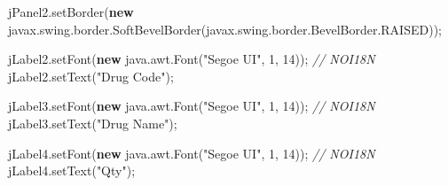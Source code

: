 \documentclass[
  10pt,
]{article}
\newenvironment{Shaded}{}{}
\newcommand{\CommentTok}[1]{\textcolor[rgb]{0.38,0.63,0.69}{\textit{#1}}}
\newcommand{\DecValTok}[1]{\textcolor[rgb]{0.25,0.63,0.44}{#1}}
\newcommand{\FunctionTok}[1]{\textcolor[rgb]{0.02,0.16,0.49}{#1}}
\newcommand{\KeywordTok}[1]{\textcolor[rgb]{0.00,0.44,0.13}{\textbf{#1}}}
\newcommand{\NormalTok}[1]{#1}
\newcommand{\OperatorTok}[1]{\textcolor[rgb]{0.40,0.40,0.40}{#1}}
\newcommand{\StringTok}[1]{\textcolor[rgb]{0.25,0.44,0.63}{#1}}
\begin{document}
\begin{Shaded}
\begin{Highlighting}[numbers=left,,]
\NormalTok{        jPanel2}\OperatorTok{.}\FunctionTok{setBorder}\OperatorTok{(}\KeywordTok{new}\NormalTok{ javax}\OperatorTok{.}\FunctionTok{swing}\OperatorTok{.}\FunctionTok{border}\OperatorTok{.}\FunctionTok{SoftBevelBorder}\OperatorTok{(}\NormalTok{javax}\OperatorTok{.}\FunctionTok{swing}\OperatorTok{.}\FunctionTok{border}\OperatorTok{.}\FunctionTok{BevelBorder}\OperatorTok{.}\FunctionTok{RAISED}\OperatorTok{));}

\NormalTok{        jLabel2}\OperatorTok{.}\FunctionTok{setFont}\OperatorTok{(}\KeywordTok{new}\NormalTok{ java}\OperatorTok{.}\FunctionTok{awt}\OperatorTok{.}\FunctionTok{Font}\OperatorTok{(}\StringTok{"Segoe UI"}\OperatorTok{,} \DecValTok{1}\OperatorTok{,} \DecValTok{14}\OperatorTok{));} \CommentTok{// NOI18N}
\NormalTok{        jLabel2}\OperatorTok{.}\FunctionTok{setText}\OperatorTok{(}\StringTok{"Drug Code"}\OperatorTok{);}

\NormalTok{        jLabel3}\OperatorTok{.}\FunctionTok{setFont}\OperatorTok{(}\KeywordTok{new}\NormalTok{ java}\OperatorTok{.}\FunctionTok{awt}\OperatorTok{.}\FunctionTok{Font}\OperatorTok{(}\StringTok{"Segoe UI"}\OperatorTok{,} \DecValTok{1}\OperatorTok{,} \DecValTok{14}\OperatorTok{));} \CommentTok{// NOI18N}
\NormalTok{        jLabel3}\OperatorTok{.}\FunctionTok{setText}\OperatorTok{(}\StringTok{"Drug Name"}\OperatorTok{);}

\NormalTok{        jLabel4}\OperatorTok{.}\FunctionTok{setFont}\OperatorTok{(}\KeywordTok{new}\NormalTok{ java}\OperatorTok{.}\FunctionTok{awt}\OperatorTok{.}\FunctionTok{Font}\OperatorTok{(}\StringTok{"Segoe UI"}\OperatorTok{,} \DecValTok{1}\OperatorTok{,} \DecValTok{14}\OperatorTok{));} \CommentTok{// NOI18N}
\NormalTok{        jLabel4}\OperatorTok{.}\FunctionTok{setText}\OperatorTok{(}\StringTok{"Qty"}\OperatorTok{);}


\end{Highlighting}
\end{Shaded}
\end{document}
